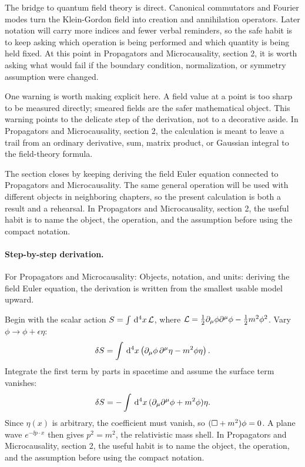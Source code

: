 The bridge to quantum field theory is direct.  Canonical commutators and Fourier modes turn the Klein-Gordon field into creation and annihilation operators.  Later notation will carry more indices and fewer verbal reminders, so the safe habit is to keep asking which operation is being performed and which quantity is being held fixed.  At this point in Propagators and Microcausality, section 2, it is worth asking what would fail if the boundary condition, normalization, or symmetry assumption were changed.

One warning is worth making explicit here.  A field value at a point is too sharp to be measured directly; smeared fields are the safer mathematical object.  This warning points to the delicate step of the derivation, not to a decorative aside.  In Propagators and Microcausality, section 2, the calculation is meant to leave a trail from an ordinary derivative, sum, matrix product, or Gaussian integral to the field-theory formula.

The section closes by keeping deriving the field Euler equation connected to Propagators and Microcausality.  The same general operation will be used with different objects in neighboring chapters, so the present calculation is both a result and a rehearsal.  In Propagators and Microcausality, section 2, the useful habit is to name the object, the operation, and the assumption before using the compact notation.



\paragraph{Step-by-step derivation.}

For Propagators and Microcausality: Objects, notation, and units: deriving the field Euler equation, the derivation is written from the smallest usable model upward.

Begin with the scalar action \(S=\int\,\mathrm d^4x\,\mathcal L\), where \(\mathcal L=\frac12\partial_\mu\phi\partial^\mu\phi-\frac12m^2\phi^2\).  Vary \(\phi\to\phi+\epsilon\eta\):
\[
  \delta S=\int\,\mathrm d^4x\left(\partial_\mu\phi\,\partial^\mu\eta-m^2\phi\eta\right).
\]
Integrate the first term by parts in spacetime and assume the surface term vanishes:
\[
  \delta S=-\int\,\mathrm d^4x\,(\partial_\mu\partial^\mu\phi+m^2\phi)\eta.
\]
Since \(\eta(x)\) is arbitrary, the coefficient must vanish, so \((\Box+m^2)\phi=0\).  A plane wave \(e^{-\ii p\cdot x}\) then gives \(p^2=m^2\), the relativistic mass shell.  In Propagators and Microcausality, section 2, the useful habit is to name the object, the operation, and the assumption before using the compact notation.

